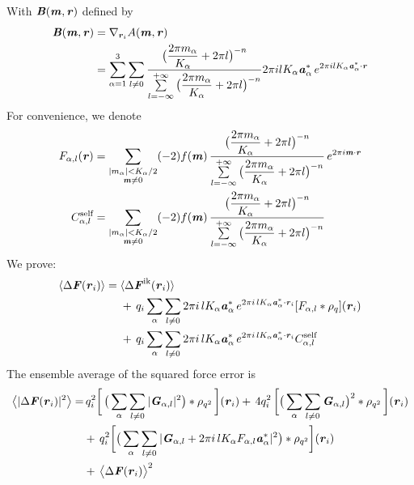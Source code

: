 \documentclass[aps,pre,preprint]{revtex4-1}
\renewcommand{\v}[1]{\textbf{\textit{#1}}}
\begin{document}
With $\v B(\v m, \v r)$ defined by
\begin{align}\nonumber
  \v B(\v m, \v r)
  &=
  \nabla_{\v r_i}A(\v m, \v r)\\
  &=
  \sum_{\alpha=1}^3\sum_{l\neq 0}
  \frac
  {\big(\dfrac{2\pi m_\alpha}{K_\alpha} + 2\pi l\big)^{-n}}
  {\sum\limits_{l=-\infty}^{+\infty}
    \big(\dfrac{2\pi m_\alpha}{K_\alpha} + 2\pi l\big)^{-n}}
  2\pi i l K_\alpha\v a_\alpha^\ast\,e^{2\pi i l K_\alpha\v a^\ast_\alpha\cdot \v r} 
\end{align}
For convenience, we denote
\begin{align}
  F_{\alpha,l} (\v r)
  &=
  \sum_{
    \begin{subarray}{c}
      \vert m_{\alpha}\vert < K_\alpha/2\\
      \v m\neq 0
    \end{subarray}}
  (-2)f(\v m)\,
  \frac
  {\big(\dfrac{2\pi m_\alpha}{K_\alpha} + 2\pi l\big)^{-n}}
  {\sum\limits_{l=-\infty}^{+\infty}
    \big(\dfrac{2\pi m_\alpha}{K_\alpha} + 2\pi l\big)^{-n}}\,
  e^{2\pi i\v m\cdot \v r}\\
  C_{\alpha,l}^{\textrm{self}}
  &= 
  \sum_{
    \begin{subarray}{c}
      \vert m_{\alpha}\vert < K_\alpha/2\\
      \v m\neq 0
    \end{subarray}}
  (-2)f(\v m)\,
  \frac
  {\big(\dfrac{2\pi m_\alpha}{K_\alpha} + 2\pi l\big)^{-n}}
  {\sum\limits_{l=-\infty}^{+\infty}
    \big(\dfrac{2\pi m_\alpha}{K_\alpha} + 2\pi l\big)^{-n}}\,
\end{align}
We prove:
\begin{align} \nonumber
  \langle \Delta\v F(\v r_i)\rangle
  =\;&
  \langle \Delta\v F^{\textrm{ik}}(\v r_i)\rangle\\\nonumber
  &+\,
  q_i\sum_{\alpha}\sum_{l\neq 0}
  2\pi i\,l K_\alpha\v a_\alpha^\ast\,e^{2\pi i\,l K_\alpha\v a^\ast_\alpha\cdot \v r_i}
  [F_{\alpha,l}\ast\rho_q](\v r_i) \\
  &+\,
  q_i\sum_{\alpha}\sum_{l\neq 0}
  2\pi i\,l K_\alpha\v a_\alpha^\ast\,e^{2\pi i\,l K_\alpha\v a^\ast_\alpha\cdot \v r_i}
  C_{\alpha,l}^{\textrm{self}}
\end{align}
The ensemble average of the squared force error is
\begin{align}\nonumber
  \big\langle
  \vert \Delta\v F(\v r_i)\vert^2
  \big\rangle
  =&\,
  q_i^2
  \bigg[\,
  \big(
  \sum_{\alpha} \sum_{l\neq 0}
  \vert \v G_{\alpha,l}\vert^2
  \big)
  \ast \rho_{q^2}
  \,\bigg] (\v r_i)
  +\,
  4q_i^2\,
  \bigg[
  \big(
  \sum_{\alpha} \sum_{l\neq 0}  
  \v G_{\alpha,l}
  \big)^2
  \ast \rho_{q^2}\,
  \bigg] (\v r_i) \\\nonumber
  & +\,
  q_i^2
  \bigg[
  \big(
  \sum_{\alpha}\sum_{l\neq 0}
  \vert
  \v G_{\alpha,l} + 2\pi i\,l K_\alpha F_{\alpha,l} \v a_\alpha^\ast\vert^2
  \big)
  \ast \rho_{q^2}
  \bigg]
  (\v r_i) \\
  & +\,
  \big\langle \Delta\v F(\v r_i)\big\rangle ^2
\end{align}
\end{document}
